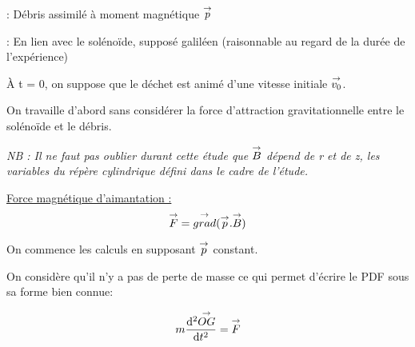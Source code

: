 \documentclass{report}
\begin{document}
: {Débris assimilé à moment magnétique $\overset{\to}{p}$}

: En lien avec le solénoïde, supposé galiléen (raisonnable au regard de la durée de l'expérience)


À t = 0, on suppose que le déchet est animé d'une vitesse initiale $\overset{\to}{v_0}$.


On travaille d'abord sans considérer la force d'attraction gravitationnelle entre le solénoïde et le débris.


\emph{NB : Il ne faut pas oublier durant cette étude que $\overset{\to}{B}$ dépend de r et de z, les variables du répère cylindrique défini dans le cadre de l'étude.}

\underline{Force magnétique d'aimantation :} 
$$\overset{\to}{F} = \overset{\to}{grad}(\overset{\to}{p}.\overset{\to}{B})$$

On commence les calculs en supposant $\overset{\to}{p}$ constant.


On considère qu'il n'y a pas de perte de masse ce qui permet d'écrire le PDF sous sa forme bien connue:

$$m\frac{\mathrm{d^2}\overset{\to}{OG}}{\mathrm{d}t^2} = \overset{\to}{F}$$

 
\end{document}
